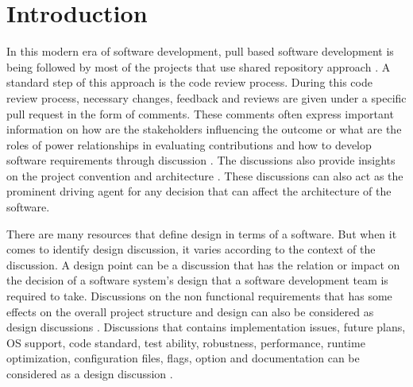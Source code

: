 \section{Introduction}
\label{sect:introduction}
In this modern era of software development, pull based software development is being followed by most of the projects that use shared repository approach \cite{Gousios2014}. A standard step of this approach is the code review process. During this code review process, necessary changes, feedback and reviews are given under a specific pull request in the form of comments. These comments often express important information on how are the stakeholders influencing the outcome or what are the roles of power relationships in evaluating contributions and how to develop software requirements through discussion \cite{Tsay2014}. The discussions also provide insights on the project convention and architecture \cite{Motta2018}. These discussions can also act as the prominent driving agent for any decision that can affect the architecture of the software.

There are many resources that define design in terms of a software. But when it comes to identify design discussion, it varies according to the context of the discussion. A design point \cite{Viviani2018} can be a discussion that has the relation or impact on the decision of a software system's design that a software development team is required to take. Discussions on the non functional requirements that has some effects on the overall project structure and design can also be considered as design discussions \cite{Sousa2018}. Discussions that contains implementation issues, future plans, OS support, code standard, test ability, robustness, performance, runtime optimization, configuration files, flags, option and documentation can be considered as a design discussion \cite{Viviani2018}.

